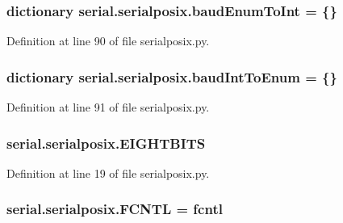 \subsubsection[{\texorpdfstring{baud\+Enum\+To\+Int}{baudEnumToInt}}]{\setlength{\rightskip}{0pt plus 5cm}dictionary serial.\+serialposix.\+baud\+Enum\+To\+Int = \{\}}\hypertarget{namespaceserial_1_1serialposix_a1855bda11053e332f5ad0dceca40b73b}{}\label{namespaceserial_1_1serialposix_a1855bda11053e332f5ad0dceca40b73b}


Definition at line 90 of file serialposix.\+py.

\subsubsection[{\texorpdfstring{baud\+Int\+To\+Enum}{baudIntToEnum}}]{\setlength{\rightskip}{0pt plus 5cm}dictionary serial.\+serialposix.\+baud\+Int\+To\+Enum = \{\}}\hypertarget{namespaceserial_1_1serialposix_a21ccb7e53208b3eee4b6dc87ed48d5e1}{}\label{namespaceserial_1_1serialposix_a21ccb7e53208b3eee4b6dc87ed48d5e1}


Definition at line 91 of file serialposix.\+py.

\subsubsection[{\texorpdfstring{E\+I\+G\+H\+T\+B\+I\+TS}{EIGHTBITS}}]{\setlength{\rightskip}{0pt plus 5cm}serial.\+serialposix.\+E\+I\+G\+H\+T\+B\+I\+TS}\hypertarget{namespaceserial_1_1serialposix_a13bbd9cdf28bc7e65e994437f952a586}{}\label{namespaceserial_1_1serialposix_a13bbd9cdf28bc7e65e994437f952a586}


Definition at line 19 of file serialposix.\+py.

\subsubsection[{\texorpdfstring{F\+C\+N\+TL}{FCNTL}}]{\setlength{\rightskip}{0pt plus 5cm}serial.\+serialposix.\+F\+C\+N\+TL = fcntl}\hypertarget{namespaceserial_1_1serialposix_a7392962531296ddfa3cf96d9844e5190}{}\label{namespaceserial_1_1serialposix_a7392962531296ddfa3cf96d9844e5190}


